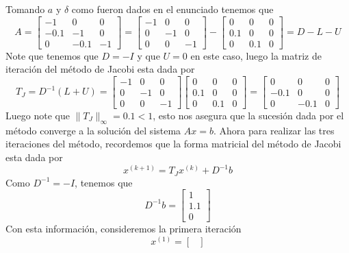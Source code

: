 \begin{enumerate}
    \begin{solution}
        Tomando $a$ y $\delta$ como fueron dados en el enunciado tenemos que 
       $$A=\begin{bmatrix}
           -1&0&0\\
           -0.1&-1&0\\
           0&-0.1&-1
       \end{bmatrix}=\begin{bmatrix}
           -1&0&0\\
           0&-1&0\\
           0&0&-1
       \end{bmatrix}-\begin{bmatrix}
           0&0&0\\
           0.1&0&0\\
           0&0.1&0
       \end{bmatrix}=D-L-U$$
       Note que tenemos que $D=-I$ y que $U=0$ en este caso, luego la matriz de iteración del método de Jacobi esta dada por
       $$T_J=D^{-1}(L+U)=\begin{bmatrix}
           -1&0&0\\
           0&-1&0\\
           0&0&-1
       \end{bmatrix}\begin{bmatrix}
            0&0&0\\
           0.1&0&0\\
           0&0.1&0
       \end{bmatrix}=\begin{bmatrix}
           0&0&0\\
           -0.1&0&0\\
           0&-0.1&0
       \end{bmatrix}$$
       Luego note que $\|T_J\|_\infty=0.1<1$,  esto nos asegura que la sucesión dada por el método converge a la solución del sistema $Ax=b.$
        Ahora para realizar las tres iteraciones del método, recordemos que la forma matricial del método de Jacobi esta dada por
        $$x^{(k+1)}=T_Jx^{(k)}+D^{-1}b$$
        Como $D^{-1}=-I$, tenemos que 
        $$D^{-1}b=\begin{bmatrix}
            1\\
            1.1\\
            0
        \end{bmatrix}$$
        Con esta información, consideremos la primera iteración
        $$x^{(1)}=\begin{bmatrix}

\end{bmatrix}$$
\end{solution}
\end{enumerate}
